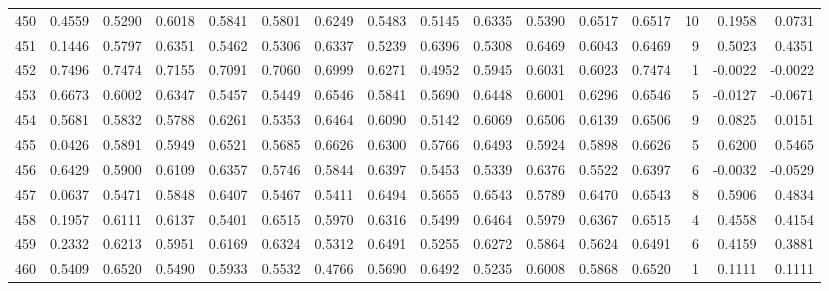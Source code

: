 \begin{tabular}{lrrrrrrrrrrrrrrr}
450 &      0.4559 &  0.5290 &  0.6018 &  0.5841 &  0.5801 &  0.6249 &  0.5483 &  0.5145 &  0.6335 &  0.5390 &   0.6517 &     0.6517 &     10 &                    0.1958 &                     0.0731 \\
451 &      0.1446 &  0.5797 &  0.6351 &  0.5462 &  0.5306 &  0.6337 &  0.5239 &  0.6396 &  0.5308 &  0.6469 &   0.6043 &     0.6469 &      9 &                    0.5023 &                     0.4351 \\
452 &      0.7496 &  0.7474 &  0.7155 &  0.7091 &  0.7060 &  0.6999 &  0.6271 &  0.4952 &  0.5945 &  0.6031 &   0.6023 &     0.7474 &      1 &                   -0.0022 &                    -0.0022 \\
453 &      0.6673 &  0.6002 &  0.6347 &  0.5457 &  0.5449 &  0.6546 &  0.5841 &  0.5690 &  0.6448 &  0.6001 &   0.6296 &     0.6546 &      5 &                   -0.0127 &                    -0.0671 \\
454 &      0.5681 &  0.5832 &  0.5788 &  0.6261 &  0.5353 &  0.6464 &  0.6090 &  0.5142 &  0.6069 &  0.6506 &   0.6139 &     0.6506 &      9 &                    0.0825 &                     0.0151 \\
455 &      0.0426 &  0.5891 &  0.5949 &  0.6521 &  0.5685 &  0.6626 &  0.6300 &  0.5766 &  0.6493 &  0.5924 &   0.5898 &     0.6626 &      5 &                    0.6200 &                     0.5465 \\
456 &      0.6429 &  0.5900 &  0.6109 &  0.6357 &  0.5746 &  0.5844 &  0.6397 &  0.5453 &  0.5339 &  0.6376 &   0.5522 &     0.6397 &      6 &                   -0.0032 &                    -0.0529 \\
457 &      0.0637 &  0.5471 &  0.5848 &  0.6407 &  0.5467 &  0.5411 &  0.6494 &  0.5655 &  0.6543 &  0.5789 &   0.6470 &     0.6543 &      8 &                    0.5906 &                     0.4834 \\
458 &      0.1957 &  0.6111 &  0.6137 &  0.5401 &  0.6515 &  0.5970 &  0.6316 &  0.5499 &  0.6464 &  0.5979 &   0.6367 &     0.6515 &      4 &                    0.4558 &                     0.4154 \\
459 &      0.2332 &  0.6213 &  0.5951 &  0.6169 &  0.6324 &  0.5312 &  0.6491 &  0.5255 &  0.6272 &  0.5864 &   0.5624 &     0.6491 &      6 &                    0.4159 &                     0.3881 \\
460 &      0.5409 &  0.6520 &  0.5490 &  0.5933 &  0.5532 &  0.4766 &  0.5690 &  0.6492 &  0.5235 &  0.6008 &   0.5868 &     0.6520 &      1 &                    0.1111 &                     0.1111 \\

\end{tabular}
